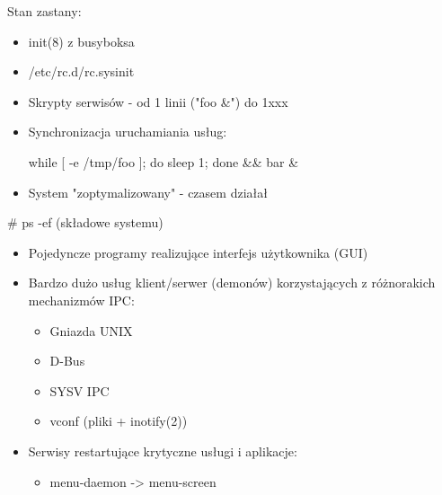 \documentclass[presentation,aspectratio=43,12pt]{beamer}
\begin{document}
\begin{frame}[label=sec-4-1]{Stan zastany:}
\begin{itemize}
\item init(8) z busyboksa
\item /etc/rc.d/rc.sysinit
\item Skrypty serwisów - od 1 linii  ("foo \&") do 1xxx

\item Synchronizacja uruchamiania usług:

while [ -e /tmp/foo ]; do sleep 1; done \&\& bar \&
\end{itemize}


\begin{itemize}
\item <2-> System "zoptymalizowany" - czasem działał
\end{itemize}

\end{frame}
\begin{frame}[label=sec-4-2]{\# ps -ef (składowe systemu)}
\begin{itemize}
\item Pojedyncze programy realizujące interfejs użytkownika (GUI)

\item <2-> Bardzo dużo usług klient/serwer (demonów) korzystających z
różnorakich mechanizmów IPC:
\begin{itemize}
\item Gniazda UNIX
\item D-Bus
\item SYSV IPC
\item vconf (pliki + inotify(2))
\end{itemize}

\item <3-> Serwisy restartujące krytyczne usługi i aplikacje:
\begin{itemize}
\item menu-daemon -> menu-screen
\end{itemize}
\end{itemize}
\end{frame}
\end{document}
